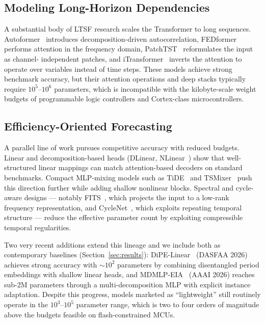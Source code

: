 \documentclass[journal]{IEEEtran}
\theoremstyle{remark}
\begin{document}
\subsection{Modeling Long-Horizon Dependencies}
A substantial body of LTSF research scales the Transformer to long
sequences. Autoformer~\cite{Wu2021Autoformer} introduces
decomposition-driven autocorrelation, FEDformer~\cite{Zhou2022FEDformer}
performs attention in the frequency domain,
PatchTST~\cite{Nie2023PatchTST} reformulates the input as channel-
independent patches, and iTransformer~\cite{Liu2024iTransformer}
inverts the attention to operate over variables instead of time steps.
These models achieve strong benchmark accuracy, but their attention
operations and deep stacks typically require $10^{5}$--$10^{6}$
parameters, which is incompatible with the kilobyte-scale weight
budgets of programmable logic controllers and Cortex-class
microcontrollers.

\subsection{Efficiency-Oriented Forecasting}
A parallel line of work pursues competitive accuracy with reduced
budgets. Linear and decomposition-based heads
(DLinear, NLinear~\cite{Zeng2023DLinear}) show that well-structured
linear mappings can match attention-based decoders on standard
benchmarks. Compact MLP-mixing models such as TiDE~\cite{Das2024TiDE}
and TSMixer~\cite{Chen2023TSMixer} push this direction further while
adding shallow nonlinear blocks. Spectral and cycle-aware designs ---
notably FITS~\cite{Xu2024FITS}, which projects the input to a low-rank
frequency representation, and CycleNet~\cite{Lin2024CycleNet}, which
exploits repeating temporal structure --- reduce the effective
parameter count by exploiting compressible temporal regularities.

Two very recent additions extend this lineage and we include both as
contemporary baselines (Section~\ref{sec:results}):
DiPE-Linear~\cite{Wintertee2026DiPELinear} (DASFAA 2026) achieves
strong accuracy with $\sim$$10^{2}$ parameters by combining
disentangled period embeddings with shallow linear heads, and
MDMLP-EIA~\cite{Zh2026MDMLPEIA} (AAAI 2026) reaches sub-2M parameters
through a multi-decomposition MLP with explicit instance adaptation.
Despite this progress, models marketed as ``lightweight'' still
routinely operate in the $10^{3}$--$10^{5}$ parameter range, which is
two to four orders of magnitude above the budgets feasible on
flash-constrained MCUs.
\end{document}
